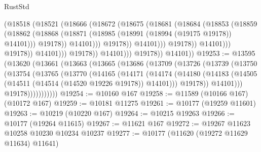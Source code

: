 \begin{lexlean}{RustStd}
\begin{coremodule}
                                        (@18518
                                          (@18521
                                            (@18666
                                              (@18672
                                                (@18675
                                                  (@18681
                                                    (@18684
                                                      (@18853
                                                        (@18859
                                                          (@18862
                                                            (@18868
                                                              (@18871
                                                                (@18985
                                                                  (@18991
                                                                    (@18994 (@19175 @19178))
                                                                    @14101)))
                                                              @19178))
                                                          @14101)))
                                                    @19178))
                                                @14101)))
                                          @19178))
                                      @14101)))
                                @19178))
                            @14101)))
                      @19178))
                  @14101)))
            @19178))
        @14101))
@19253 := @13595
    (@13620
      (@13661
        (@13663
          (@13665
            (@13686
              (@13709
                (@13726
                  (@13739
                    (@13750
                      (@13754
                        (@13765
                          (@13770
                            (@14165
                              (@14171
                                (@14174
                                  (@14180
                                    (@14183
                                      (@14505 (@14511 (@14514 (@14520 @19226 @19178)) @14101)))
                                    @19178))
                                @14101)))
                          @19178)))))))))))
@19254 := @10160 @167
@19258 := @11589 (@10166 @167) (@10172 @167)
@19259 := @10181 @11275
@19261 := @10177 (@19259 @11601)
@19263 := @10219 (@10220 @167)
@19264 := @10215 @19263
@19266 := @10177 (@19264 @11615)
@19267 := @11621 @167
@19272 := @19267 @11623 @10258 @10230 @10234 @10237
@19277 := @10177 (@11620 (@19272 @11629 @11634) @11641)

\end{coremodule}
\end{lexlean}
